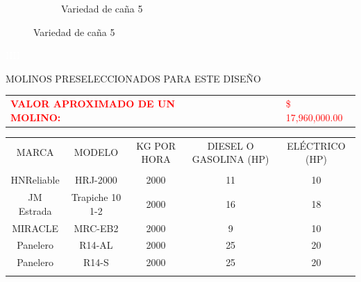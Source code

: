 \documentclass{article}%
\begin{document}
\begin{figure}[h!]
\begin{subfigure}{0.33\linewidth}
\caption{Variedad de caña 5}%
\end{subfigure}%
\linebreak%
\newpage%
\end{figure}

%
\newpage%
\textcolor{white}{ 
HH
}%
\newpage%
\begin{center}%
\begin{Huge}%
MOLINOS PRESELECCIONADOS PARA ESTE DISEÑO%
\end{Huge}%
\linebreak%
\end{center}%
\begin{tabular}{lcccccl}%
\textcolor{red}{ 
\textbf{VALOR APROXIMADO DE UN MOLINO: }
}& & & & & &\textcolor{red}{ 
\$ 17,960,000.00
}\\%
\end{tabular}%
\linebreak%
\begin{tabular}{ccccc}%
MARCA&MODELO&KG POR HORA&DIESEL O GASOLINA (HP)&ELÉCTRICO (HP)\\%
&&&&\\%
HNReliable&HRJ{-}2000&2000&11&10\\%
JM Estrada&Trapiche 10 1{-}2&2000&16&18\\%
MIRACLE&MRC{-}EB2&2000&9&10\\%
Panelero&R14{-}AL&2000&25&20\\%
Panelero&R14{-}S&2000&25&20\\%
\linebreak%
\newline%
%
\linebreak%
\end{tabular}%
\end{document}

